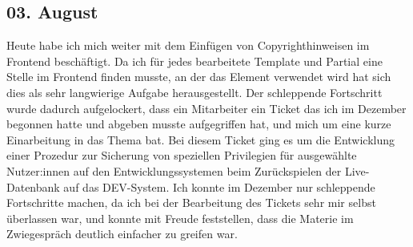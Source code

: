 \subsection{03. August}
Heute habe ich mich weiter mit dem Einfügen von Copyrighthinweisen im Frontend beschäftigt. Da ich für jedes bearbeitete Template und Partial eine Stelle im Frontend finden musste, an der das Element verwendet wird hat sich dies als sehr langwierige Aufgabe herausgestellt. Der schleppende Fortschritt wurde dadurch aufgelockert, dass ein Mitarbeiter ein Ticket das ich im Dezember begonnen hatte und abgeben musste aufgegriffen hat, und mich um eine kurze Einarbeitung in das Thema bat. Bei diesem Ticket ging es um die Entwicklung einer Prozedur zur Sicherung von speziellen Privilegien für ausgewählte Nutzer:innen auf den Entwicklungssystemen beim Zurückspielen der Live-Datenbank auf das DEV-System. Ich konnte im Dezember nur schleppende Fortschritte machen, da ich bei der Bearbeitung des Tickets sehr mir selbst überlassen war, und konnte mit Freude feststellen, dass die Materie im Zwiegespräch deutlich einfacher zu greifen war.